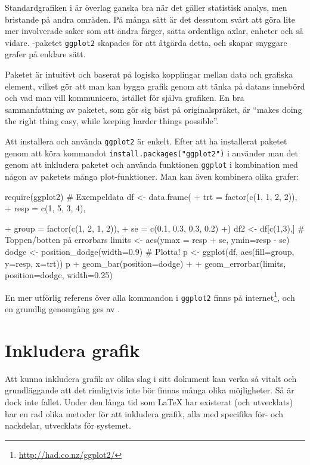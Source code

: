 \documentclass[10pt,../../a4.tex]{subfiles}
\begin{document}
Standardgrafiken i \Rlogo är överlag ganska bra när det gäller statistisk
analys, men bristande på andra områden. På många sätt är det dessutom 
svårt att göra lite mer involverade saker som att ändra färger, sätta
ordentliga axlar, enheter och så vidare. \Rlogo-paketet \texttt{ggplot2}
skapades för att åtgärda detta, och skapar snyggare grafer på enklare
sätt.

Paketet är intuitivt och baserat på logiska kopplingar mellan data och
grafiska element, vilket gör att man kan bygga grafik genom att tänka
på datans innebörd och vad man vill kommunicera, istället för själva 
grafiken. En bra sammanfattning av paketet, som gör sig bäst på
originalspråket, är \foreignquote{english}{makes doing the right thing
easy, while keeping harder things possible}.

Att installera och använda \texttt{ggplot2} är enkelt. Efter att ha 
installerat paketet genom att köra kommandot
\verb|install.packages("ggplot2")|
i \Rlogo använder man det genom att inkludera paketet och använda
funktionen \texttt{ggplot} i kombination med någon av paketets många
plot-funktioner. Man kan även kombinera olika grafer:%
\begin{rcode}
require(ggplot2)
# Exempeldata
df <- data.frame(
+   trt = factor(c(1, 1, 2, 2)),
+   resp = c(1, 5, 3, 4), 
\end{rcode}
\begin{rcode}
+   group = factor(c(1, 2, 1, 2)),
+   se = c(0.1, 0.3, 0.3, 0.2)
+) 
df2 <- df[c(1,3),] 
# Toppen/botten på errorbars
limits <- aes(ymax = resp + se, ymin=resp - se)
dodge <- position_dodge(width=0.9)
# Plotta!
p <- ggplot(df, aes(fill=group, y=resp, x=trt))
p + geom_bar(position=dodge) +
  + geom_errorbar(limits, position=dodge, width=0.25)
\end{rcode}

En mer utförlig referens över alla kommandon i \texttt{ggplot2} finns
på internet\footnote{\url{http://had.co.nz/ggplot2/}}, och en grundlig
genomgång ges av \textcite{Hadley09}.

\section{Inkludera grafik}\label{sec:includegraphics}
Att kunna inkludera grafik av olika slag i sitt dokument kan verka så
vitalt och grundläggande att det rimligtvis inte bör finnas många olika
möjligheter. Så är dock inte fallet. Under den långa tid som \LaTeX{} har
existerat (och utvecklats) har en rad olika metoder för att inkludera
grafik, alla med specifika för- och nackdelar, utvecklats för systemet.
\end{document}
